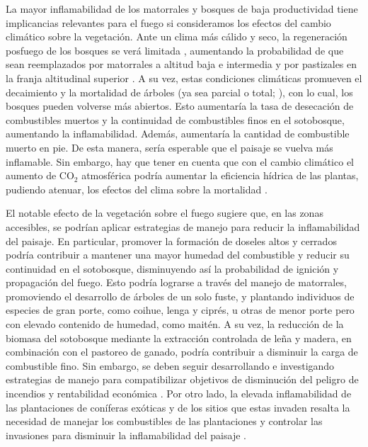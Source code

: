 La mayor inflamabilidad de los matorrales y bosques de baja productividad tiene implicancias relevantes para el fuego si consideramos los efectos del cambio climático sobre la vegetación. Ante un clima más cálido y seco, la regeneración posfuego de los bosques se verá limitada \citep{tercero-bucardo_field_2007}, aumentando la probabilidad de que sean reemplazados por matorrales a altitud baja e intermedia y por pastizales en la franja altitudinal superior \citep{kitzberger_firevegetation_2016, kitzberger_projections_2022}. A su vez, estas condiciones climáticas promueven el decaimiento y la mortalidad de árboles (ya sea parcial o total; \citealt{suarez2004factors,gutierrez2014increased,rodriguez2016influence,molowny2017changes}), con lo cual, los bosques pueden volverse más abiertos. Esto aumentaría la tasa de desecación de combustibles muertos y la continuidad de combustibles finos en el sotobosque, aumentando la inflamabilidad. Además, aumentaría la cantidad de combustible muerto en pie. De esta manera, sería esperable que el paisaje se vuelva más inflamable. Sin embargo, hay que tener en cuenta que con el cambio climático el aumento de $\text{CO}_2$ atmosférica podría aumentar la eficiencia hídrica de las plantas, pudiendo atenuar, los efectos del clima sobre la mortalidad \citep{silva2013probing,sperlich2020gains}.

El notable efecto de la vegetación sobre el fuego sugiere que, en las zonas accesibles, se podrían aplicar estrategias de manejo para reducir la inflamabilidad del paisaje. En particular, promover la formación de doseles altos y cerrados podría contribuir a mantener una mayor humedad del combustible  y reducir su continuidad en el sotobosque, disminuyendo así la probabilidad de ignición y propagación del fuego. Esto podría lograrse a través del manejo de matorrales, promoviendo el desarrollo de árboles de un solo fuste, y plantando individuos de especies de gran porte, como coihue, lenga y ciprés, u otras de menor porte pero con elevado contenido de humedad, como maitén. A su vez, la reducción de la biomasa del sotobosque mediante la extracción controlada de leña y madera, en combinación con el pastoreo de ganado, podría contribuir a disminuir la carga de combustible fino. Sin embargo, se deben seguir desarrollando e investigando estrategias de manejo para compatibilizar objetivos de disminución del peligro de incendios y rentabilidad económica \citep{peri_review_2016, goldenberg_efecto_2018, goldenberg_effects_2020, goldenberg_shrubland_2021}. Por otro lado, la elevada inflamabilidad de las plantaciones de coníferas exóticas y de los sitios que estas invaden resalta la necesidad de manejar los combustibles de las plantaciones y controlar las invasiones para disminuir la inflamabilidad del paisaje \citep{paritsis_pine_2018, cingolani2023enrichment, franzese_legacy_2022}.

